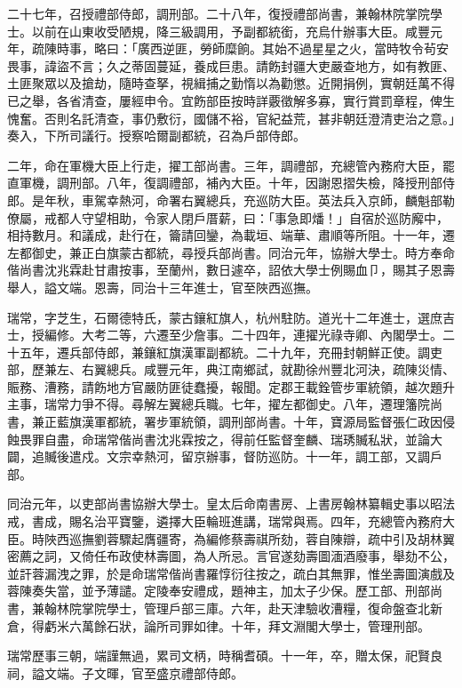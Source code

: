 \begin{pinyinscope}
二十七年，召授禮部侍郎，調刑部。二十八年，復授禮部尚書，兼翰林院掌院學士。以前在山東收受陋規，降三級調用，予副都統銜，充烏什辦事大臣。咸豐元年，疏陳時事，略曰：「廣西逆匪，勞師糜餉。其始不過星星之火，當時牧令茍安畏事，諱盜不言；久之蒂固蔓延，養成巨患。請飭封疆大吏嚴查地方，如有教匪、土匪聚眾以及搶劫，隨時查拏，視緝捕之勤惰以為勸懲。近開捐例，實朝廷萬不得已之舉，各省清查，屢經申令。宜飭部臣按時詳覈徵解多寡，實行賞罰章程，俾生愧奮。否則名託清查，事仍敷衍，國儲不裕，官紀益荒，甚非朝廷澄清吏治之意。」奏入，下所司議行。授察哈爾副都統，召為戶部侍郎。

二年，命在軍機大臣上行走，擢工部尚書。三年，調禮部，充總管內務府大臣，罷直軍機，調刑部。八年，復調禮部，補內大臣。十年，因謝恩摺失檢，降授刑部侍郎。是年秋，車駕幸熱河，命署右翼總兵，充巡防大臣。英法兵入京師，麟魁部勒僚屬，戒都人守望相助，令家人閉戶厝薪，曰：「事急即燔！」自宿於巡防廨中，相持數月。和議成，赴行在，籥請回鑾，為載垣、端華、肅順等所阻。十一年，遷左都御史，兼正白旗蒙古都統，尋授兵部尚書。同治元年，協辦大學士。時方奉命偕尚書沈兆霖赴甘肅按事，至蘭州，數日遽卒，詔依大學士例賜血⼙，賜其子恩壽舉人，謚文端。恩壽，同治十三年進士，官至陜西巡撫。

瑞常，字芝生，石爾德特氏，蒙古鑲紅旗人，杭州駐防。道光十二年進士，選庶吉士，授編修。大考二等，六遷至少詹事。二十四年，連擢光祿寺卿、內閣學士。二十五年，遷兵部侍郎，兼鑲紅旗漢軍副都統。二十九年，充冊封朝鮮正使。調吏部，歷兼左、右翼總兵。咸豐元年，典江南鄉試，就勘徐州豐北河決，疏陳災情、賑務、漕務，請飭地方官嚴防匪徒蠢擾，報聞。定郡王載銓管步軍統領，越次題升主事，瑞常力爭不得。尋解左翼總兵職。七年，擢左都御史。八年，遷理籓院尚書，兼正藍旗漢軍都統，署步軍統領，調刑部尚書。十年，寶源局監督張仁政因侵蝕畏罪自盡，命瑞常偕尚書沈兆霖按之，得前任監督奎麟、瑞琇贓私狀，並論大闢，追贓後遣戍。文宗幸熱河，留京辦事，督防巡防。十一年，調工部，又調戶部。

同治元年，以吏部尚書協辦大學士。皇太后命南書房、上書房翰林纂輯史事以昭法戒，書成，賜名治平寶鑒，遴擇大臣輪班進講，瑞常與焉。四年，充總管內務府大臣。時陜西巡撫劉蓉驟起膺疆寄，為編修蔡壽祺所劾，蓉自陳辯，疏中引及胡林翼密薦之詞，又倚任布政使林壽圖，為人所忌。言官遂劾壽圖湎酒廢事，舉劾不公，並訐蓉漏洩之罪，於是命瑞常偕尚書羅惇衍往按之，疏白其無罪，惟坐壽圖演戲及蓉陳奏失當，並予薄譴。定陵奉安禮成，題神主，加太子少保。歷工部、刑部尚書，兼翰林院掌院學士，管理戶部三庫。六年，赴天津驗收漕糧，復命盤查北新倉，得虧米六萬餘石狀，論所司罪如律。十年，拜文淵閣大學士，管理刑部。

瑞常歷事三朝，端謹無過，累司文柄，時稱耆碩。十一年，卒，贈太保，祀賢良祠，謚文端。子文暉，官至盛京禮部侍郎。


\end{pinyinscope}
